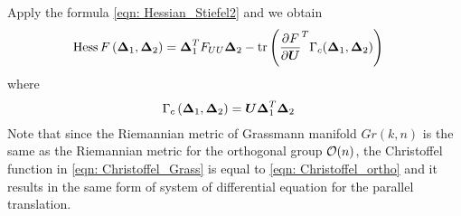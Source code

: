 \documentclass[11pt]{article}
\begin{document}
Apply the formula \eqref{eqn: Hessian_Stiefel2} and we obtain 
\begin{align}
\text{Hess}\,F\paren{\mb{\Delta}_{1}, \mb{\Delta}_{2}}%
&= \mb{\Delta}_{1}^{T}F_{UU}\mb{\Delta}_{2}-  \tr{\partdiff{F}{\mb{U}}^{T}\Gamma_{c}(\mb{\Delta}_{1}, \mb{\Delta}_{2})  } \label{eqn: Hessian_Grass} 
\end{align}
where 
\begin{align}
\Gamma_{c}\left(\boldsymbol{\Delta}_{1}, \boldsymbol{\Delta}_{2}\right) &= \boldsymbol{U}\boldsymbol{\Delta}_{1}^{T}\boldsymbol{\Delta}_{2} \label{eqn: Christoffel_Grass}
\end{align}
Note that since the Riemannian metric of Grassmann manifold $Gr(k,n)$ is the same as the Riemannian metric for the orthogonal group ${\mathcal O}(n)$, the Christoffel function in \eqref{eqn: Christoffel_Grass} is equal to \eqref{eqn: Christoffel_ortho} and it results in the same form of system of  differential equation for the parallel translation.


\newpage


\end{document}
